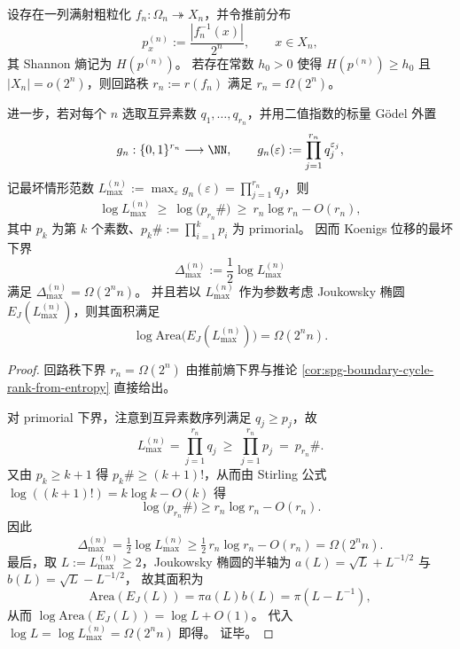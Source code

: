 \begin{theorem}\label{thm:spg-scalar-godelization-entropy-doubleexp}
设存在一列满射粗粒化 \(f_n:\Omega_n\twoheadrightarrow X_n\)，并令推前分布
\[
p_x^{(n)}:=\frac{|f_n^{-1}(x)|}{2^n},\qquad x\in X_n,
\]
其 Shannon 熵记为 \(H(p^{(n)})\)。
若存在常数 \(h_0>0\) 使得 \(H(p^{(n)})\ge h_0\) 且 \(|X_n|=o(2^n)\)，则回路秩 \(r_n:=r(f_n)\) 满足 \(r_n=\Omega(2^n)\)。

进一步，若对每个 \(n\) 选取互异素数 \(q_1,\dots,q_{r_n}\)，并用二值指数的标量 Gödel 外置
\[
g_n:\{0,1\}^{r_n}\longrightarrow \NN,\qquad g_n(\varepsilon):=\prod_{j=1}^{r_n} q_j^{\varepsilon_j},
\]
记最坏情形范数 \(L_{\max}^{(n)}:=\max_{\varepsilon}g_n(\varepsilon)=\prod_{j=1}^{r_n}q_j\)，则
\[
\log L_{\max}^{(n)}\ \ge\ \log\bigl(p_{r_n}\#\bigr)\ \ge\ r_n\log r_n-O(r_n),
\]
其中 \(p_k\) 为第 \(k\) 个素数、\(p_k\#:=\prod_{i=1}^k p_i\) 为 primorial。
因而 Koenigs 位移的最坏下界
\[
\Delta_{\max}^{(n)}:=\frac12\log L_{\max}^{(n)}
\]
满足 \(\Delta_{\max}^{(n)}=\Omega(2^n n)\)。
并且若以 \(L_{\max}^{(n)}\) 作为参数考虑 Joukowsky 椭圆 \(E_J(L_{\max}^{(n)})\)，则其面积满足
\[
\log\mathrm{Area}\bigl(E_J(L_{\max}^{(n)})\bigr)=\Omega(2^n n).
\]
\end{theorem}
\begin{proof}
回路秩下界 \(r_n=\Omega(2^n)\) 由推前熵下界与推论 \ref{cor:spg-boundary-cycle-rank-from-entropy} 直接给出。

对 primorial 下界，注意到互异素数序列满足 \(q_j\ge p_j\)，故
\[
L_{\max}^{(n)}=\prod_{j=1}^{r_n}q_j\ \ge\ \prod_{j=1}^{r_n}p_j\ =\ p_{r_n}\#.
\]
又由 \(p_k\ge k+1\) 得 \(p_k\#\ge (k+1)!\)，从而由 Stirling 公式 \(\log((k+1)!)=k\log k-O(k)\) 得
\[
\log\bigl(p_{r_n}\#\bigr)\ge r_n\log r_n-O(r_n).
\]
因此
\[
\Delta_{\max}^{(n)}=\tfrac12\log L_{\max}^{(n)}\ge \tfrac12\,r_n\log r_n-O(r_n)=\Omega(2^n n).
\]
最后，取 \(L:=L_{\max}^{(n)}\ge 2\)，Joukowsky 椭圆的半轴为
\(
a(L)=\sqrt L+L^{-1/2}
\)
与
\(
b(L)=\sqrt L-L^{-1/2}
\)，
故其面积为
\[
\mathrm{Area}(E_J(L))=\pi a(L)b(L)=\pi(L-L^{-1}),
\]
从而 \(\log\mathrm{Area}(E_J(L))=\log L+O(1)\)。
代入 \(\log L=\log L_{\max}^{(n)}=\Omega(2^n n)\) 即得。
证毕。
\end{proof}

\endinput
